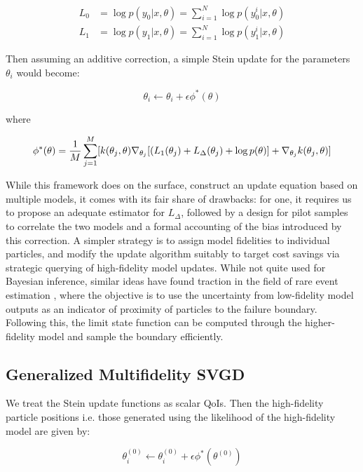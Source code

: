 \documentclass[12pt]{article}
\renewcommand{\[}{\left[}
\renewcommand{\]}{\right]}
\renewcommand{\(}{\left(}
\renewcommand{\)}{\right)}
\newcommand{\grad}[1]{\nabla #1}
\begin{document}
\begin{align}
 L_0 &= \log p(y_0 | x, \theta) = \sum_{i=1}^{N} \log p(y_0^i | x, \theta) \\
 L_1 &= \log p(y_1 | x, \theta) = \sum_{i=1}^{N} \log p(y_1^i | x, \theta)
\end{align}


Then assuming an additive correction, a simple Stein update for the parameters $\theta_i$ would become:

\begin{equation}
    \theta_i \leftarrow \theta_i + \epsilon \phi^{\ast}(\theta)
\end{equation}

where 

\begin{equation}
    \phi^{\ast}(\theta) = \frac{1}{M}\sum_{j=1}^{M}[k(\theta_j, \theta) \grad_{\theta_j}[(L_{1}(\theta_j) + L_{\Delta}(\theta_j) + \log p(\theta)] + \grad_{\theta_j} k(\theta_j, \theta)]
\end{equation}

While this framework does on the surface, construct an update equation based on multiple models, it comes with its fair share of drawbacks: for one, it requires us to propose an adequate estimator for $L_{\Delta}$, followed by a design for pilot samples to correlate the two models and a formal accounting of the bias introduced by this correction. 
A simpler strategy is to assign model fidelities to individual particles, and modify the update algorithm suitably to target cost savings via strategic querying of high-fidelity model updates. While not quite used for Bayesian inference, similar ideas have found traction in the field of rare event estimation \cite{dhulipala_bayesian_2022}, where the objective is to use the uncertainty from low-fidelity model outputs as an indicator of proximity of particles to the failure boundary. Following this, the limit state function can be computed through the higher-fidelity model and sample the boundary efficiently.

\subsection{Generalized Multifidelity SVGD}

We treat the Stein update functions as scalar QoIs. Then the high-fidelity particle positions i.e. those generated using the likelihood of the high-fidelity model are given by:

\begin{equation*}
    \theta^{(0)}_i \leftarrow \theta^{(0)}_i + \epsilon \phi^{\ast}(\theta^{(0)})
\end{equation*}
\end{document}
